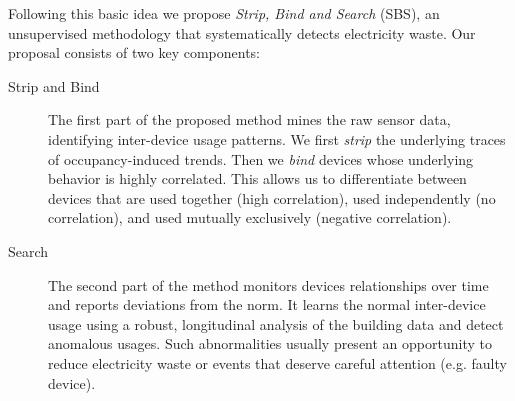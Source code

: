 Following this basic idea we propose \emph{Strip, Bind and Search} (SBS), an unsupervised methodology that systematically detects electricity waste.
Our proposal consists of two key components:

\begin{description}
 \item[Strip and Bind] The first part of the proposed method mines the raw sensor data, identifying inter-device usage patterns. %
We first \emph{strip} the underlying traces of occupancy-induced trends.  Then we \emph{bind} devices  whose underlying behavior is highly correlated. %
 This allows us to differentiate between devices that are used together (high correlation), used independently (no correlation), and used mutually exclusively (negative correlation).
 \item[Search] The second part of the method monitors devices relationships over time and reports deviations from the norm.  %
 It learns the normal inter-device usage using a robust, longitudinal analysis of the building data and detect anomalous usages.  Such abnormalities usually present an opportunity to reduce electricity waste or events that deserve careful attention (e.g. faulty device).
\end{description}

